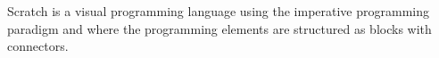 Scratch is a visual programming language using the imperative programming paradigm and where the programming elements are structured as blocks with connectors.